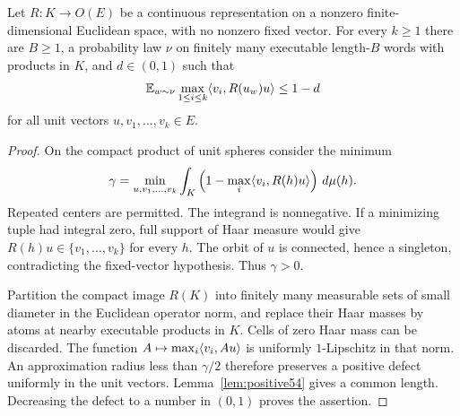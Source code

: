 \begin{lemma}\label{lem:gap54}
Let $R:K\to O(E)$ be a continuous representation on a nonzero finite-dimensional Euclidean space, with no nonzero fixed vector. For every $k\ge1$ there are $B\ge1$, a probability law $\nu$ on finitely many executable length-$B$ words with products in $K$, and $d\in(0,1)$ such that
\begin{equation}\label{eq:gap54}
 \mathbb E_{w\sim\nu}\max_{1\le i\le k}\langle v_i,R(u_w)u\rangle\le1-d
\end{equation}
for all unit vectors $u,v_1,\ldots,v_k\in E$.
\end{lemma}
\begin{proof}
On the compact product of unit spheres consider the minimum
\[
 \gamma=\min_{u,v_1,\ldots,v_k}\int_K
 \left(1-\max_i\langle v_i,R(h)u\rangle\right)\,d\mu(h).
\]
Repeated centers are permitted. The integrand is nonnegative. If a minimizing tuple had integral zero, full support of Haar measure would give $R(h)u\in\{v_1,\ldots,v_k\}$ for every $h$. The orbit of $u$ is connected, hence a singleton, contradicting the fixed-vector hypothesis. Thus $\gamma>0$.

Partition the compact image $R(K)$ into finitely many measurable sets of small diameter in the Euclidean operator norm, and replace their Haar masses by atoms at nearby executable products in $K$. Cells of zero Haar mass can be discarded. The function $A\mapsto\max_i\langle v_i,Au\rangle$ is uniformly $1$-Lipschitz in that norm. An approximation radius less than $\gamma/2$ therefore preserves a positive defect uniformly in the unit vectors. Lemma~\ref{lem:positive54} gives a common length. Decreasing the defect to a number in $(0,1)$ proves the assertion.
\end{proof}

